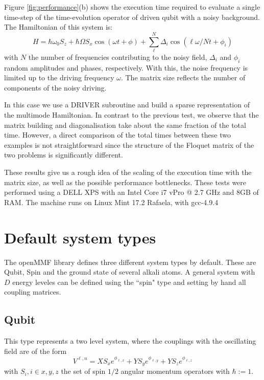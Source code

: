 \documentclass[10pt,a4paper]{article}
\begin{document}
Figure \ref{fig:performance}(b) shows the execution time required to evaluate a single time-step of the time-evolution operator of driven qubit with a noisy background. The Hamiltonian of this system is:
\begin{equation}
H = \hbar \omega_0 S_z + \hbar \Omega S_x \cos (\omega t + \phi) + \sum_\ell^N \Delta_i \cos(\ell \omega/N t + \phi_i)
\end{equation}
with $N$ the number of frequencies contributing to the noisy field, $\Delta_i$ and $\phi_i$ random amplitudes and phases, respectively. With this, the noise frequency is limited up to the driving frequency $\omega$. The matrix size reflects the number of components of the noisy driving. 

In this case we use a DRIVER subroutine and build a sparse representation of the multimode Hamiltonian. In contrast to the previous test, we observe that the matrix building and diagonalisation take about the same fraction of the total time. However, a direct comparison of the total times between these two examples is not straightforward since the structure of the Floquet matrix of the two problems is significantly different. 

These results give us a rough idea of the scaling of the execution time with the matrix size, as well as the possible performance bottlenecks. These tests were performed using a DELL XPS with an Intel Core i7 vPro @ 2.7 GHz and 8GB of RAM. The machine runs on Linux Mint 17.2 Rafaela, with gcc-4.9.4


\section{Default system types}
\label{sec:InitOptions}

The openMMF library defines three different system types by default. These are Qubit, Spin and the ground state of several alkali atoms. A general system with $D$ energy leveles can be defined using the ``spin" type and setting by hand all coupling matrices.  

\subsection{Qubit}
This type represents a two level system, where the couplings with the oscillating field are of the form
\begin{equation}
V^{\ell,n} = X S_x e^{\phi_{\ell,x}} +  Y S_y e^{\phi_{\ell,y}} + Y S_z e^{\phi_{\ell,z}}
\end{equation}
with $S_i, i\in{x,y,z}$ the set of spin $1/2$ angular momentum operators with $\hbar := 1$.
\end{document}
